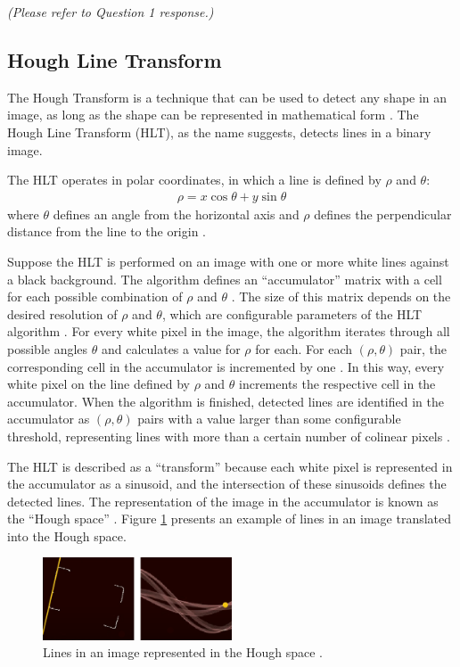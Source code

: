 \textit{(Please refer to Question 1 response.)}

\subsection{Hough Line Transform}

The Hough Transform is a technique that can be used to detect any shape in an image, as long as the shape can be represented in mathematical form \cite{opencv_hlt}. The Hough Line Transform (HLT), as the name suggests, detects lines in a binary image.

The HLT operates in polar coordinates, in which a line is defined by $\rho$ and $\theta$:
\begin{align}
  \rho = x \cos\theta + y \sin\theta
\end{align}
where $\theta$ defines an angle from the horizontal axis and $\rho$ defines the perpendicular distance from the line to the origin \cite{opencv_hlt}.

Suppose the HLT is performed on an image with one or more white lines against a black background. The algorithm defines an ``accumulator'' matrix with a cell for each possible combination of $\rho$ and $\theta$ \cite{opencv_hlt}. The size of this matrix depends on the desired resolution of $\rho$ and $\theta$, which are configurable parameters of the HLT algorithm \cite{opencv_hlt}. For every white pixel in the image, the algorithm iterates through all possible angles $\theta$ and calculates a value for $\rho$ for each. For each $(\rho,\theta)$ pair, the corresponding cell in the accumulator is incremented by one \cite{opencv_hlt}. In this way, every white pixel on the line defined by $\rho$ and $\theta$ increments the respective cell in the accumulator. When the algorithm is finished, detected lines are identified in the accumulator as $(\rho,\theta)$ pairs with a value larger than some configurable threshold, representing lines with more than a certain number of colinear pixels \cite{opencv_hlt}.

The HLT is described as a ``transform'' because each white pixel is represented in the accumulator as a sinusoid, and the intersection of these sinusoids defines the detected lines. The representation of the image in the accumulator is known as the ``Hough space'' \cite{opencv_hlt}. Figure \ref{fig:hough_line} presents an example of lines in an image translated into the Hough space.

\begin{figure}[ht]
  \centering
  \includegraphics[width=0.5\textwidth]{images/hough_transform.png}
  \caption{Lines in an image represented in the Hough space \cite{korting_hlt}.}
  \label{fig:hough_line}
\end{figure}

